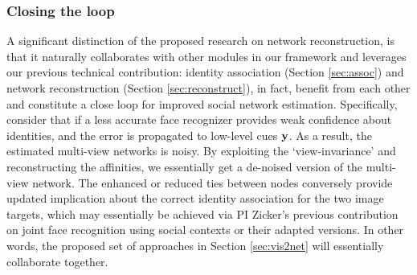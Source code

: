 
\subsubsection{Closing the loop}

A significant distinction of the proposed research on network reconstruction, is that it naturally collaborates with other modules in our framework and leverages our previous technical contribution: identity association (Section \ref{sec:assoc}) and network reconstruction (Section \ref{sec:reconstruct}), in fact, benefit from each other and constitute a close loop for improved social network estimation. Specifically, consider that if a less accurate face recognizer provides weak confidence about identities, and the error is propagated to low-level cues ${\bf y}$. As a result, the estimated multi-view networks is noisy. By exploiting the `view-invariance' and reconstructing the affinities, we essentially get a de-noised version of the multi-view network. The enhanced or reduced ties between nodes conversely provide updated implication about the correct identity association for the two image targets, which may essentially be achieved via PI Zicker's previous contribution on joint face recognition using social contexts \cite{Stone2008,Stone2010} or their adapted versions. In other words, the proposed set of approaches in Section \ref{sec:vis2net} will essentially collaborate together.